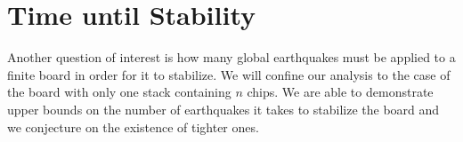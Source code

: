 \documentclass[runningheads,a4paper]{llncs}
\begin{document}
%

\section{Time until Stability}
\label{Time until Stability}

Another question of interest is how many global earthquakes must be applied to a finite board in order for it to stabilize. We will confine our analysis to the case of the board with only one stack containing $n$ chips. We are able to demonstrate upper bounds on the number of earthquakes it takes to stabilize the board and we conjecture on the existence of tighter ones.  
\end{document}
